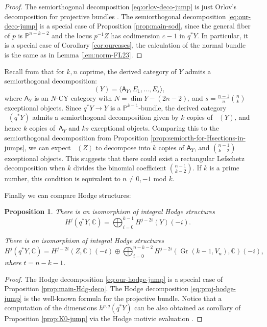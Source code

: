 \documentclass[11pt]{article}
\theoremstyle{plain}
\newtheorem{prop}[theorem]{Proposition}
\theoremstyle{definition}
\newcommand{\cat}[1]{\mathsf{#1}}
\newcommand{\sod}[1]{\langle #1 \rangle}
\DeclareMathOperator{\Db}{{\cat{D}^{\mathrm{b}}}}
\DeclareMathOperator{\Gr}{Gr}
\newcommand{\CC}{\mathbb{C}}
\newcommand{\PP}{\mathbb{P}}
\begin{document}
\begin{proof}
The semiorthogonal decomposition \eqref{eq:orlov-deco-jump} is just Orlov's decomposition for projective
bundles \cite{orlovprojbund}. The semiorthogonal decomposition \eqref{eq:our-deco-jump} is a special
case of Proposition \ref{prop:main-sod}, since the general fiber of $p$ is $\PP^{n-k-2}$ and the
locus $p^{-1}Z$ has codimension $c-1$ in $q^*Y$. In particular, it is a special case of
Corollary \ref{cor:ourcases}, the calculation of the normal bundle is the same as in Lemma \ref{lem:norm-FL23}.
\end{proof}

Recall from \cite[Cor.\,4.4]{kuz-fractional} that for $k,n$ coprime, the derived category of $Y$
admits a semiorthogonal decomposition:
\[
\Db(Y)= \sod{\cat{A}_Y,E_1,\ldots,E_s},
\]
where $\cat{A}_Y$ is an $N$-CY category with $N=\dim Y-(2n-2)$, and $s=\frac{n-1}{n}\binom{n}{k}$ exceptional objects.
Since $q^*Y \to Y$ is a $\PP^{k-1}$-bundle, the derived category
$\Db(q^*Y)$ admits a semiorthogonal decomposition given by $k$ copies of $\Db(Y)$, and hence
$k$ copies of~$\cat{A}_Y$ and $ks$ exceptional objects. Comparing this to the semiorthogonal
decomposition from Proposition \ref{prop:semiorth-for-Hsections-in-jumps},
we can expect $\Db(Z)$ to decompose into $k$ copies of $\cat{A}_Y$,
and $\binom{n-1}{k-2}$ exceptional objects. This suggests that there could exist a rectangular Lefschetz
decomposition when $k$ divides the binomial coefficient $\binom{n-1}{k-2}$. If $k$ is a prime
number, this condition is equivalent to $n\ne 0,-1$ mod $k$.

Finally we can compare Hodge structures:

\begin{prop}\label{prop:Hodge-jump}
There is an isomorphism of integral Hodge structures
\begin{equation}\label{eq:proj-hodge-jump}
H^j(q^*Y,\CC) = \bigoplus_{i=0}^{k-1} H^{j-2i}(Y)(-i).
\end{equation}

There is an isomorphism of integral Hodge structures
\begin{equation}\label{eq:our-hodge-jump}
H^j(q^*Y,\CC) = H^{j-2t}(Z,\CC)(-t) \oplus \bigoplus_{i=0}^{n-k-2} H^{j-2i}(\Gr(k-1,V_n),\CC)(-i),
\end{equation}
where $t=n-k-1$.
\end{prop}

\begin{proof}
The Hodge decomposition \eqref{eq:our-hodge-jump} is a special case of Proposition \ref{prop:main-Hdg-deco}. The Hodge decomposition \eqref{eq:proj-hodge-jump} is the well-known formula for the projective bundle.
Notice that a computation of the dimensions $h^{p,q}(q^*Y)$ can be also obtained as corollary of Proposition \ref{prop:K0-jump} via the Hodge motivic evaluation
\cite[\S 3.2]{craw}.
\end{proof}
\end{document}
